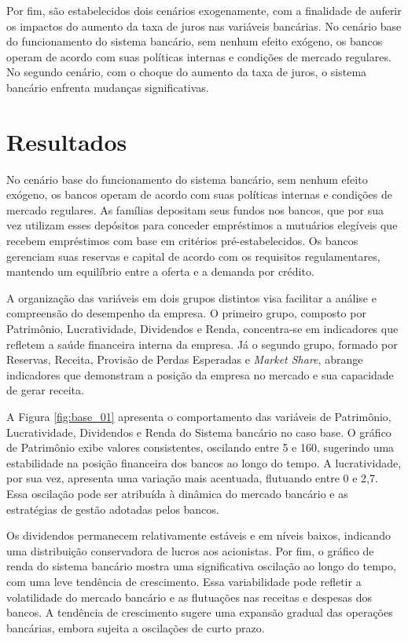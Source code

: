 \documentclass[hidelinks, article,12pt,oneside,a4paper,english,brazil,sumario=tradicional]{abntex2}
\begin{document}
Por fim, são estabelecidos dois cenários exogenamente, com a finalidade de auferir os impactos do aumento da taxa de juros nas variáveis bancárias. No cenário base do funcionamento do sistema bancário, sem nenhum efeito exógeno, os bancos operam de acordo com suas políticas internas e condições de mercado regulares. No segundo cenário, com o choque do aumento da taxa de juros, o sistema bancário enfrenta mudanças significativas. 



\section{Resultados}

No cenário base do funcionamento do sistema bancário, sem nenhum efeito exógeno, os bancos operam de acordo com suas políticas internas e condições de mercado regulares. As famílias depositam seus fundos nos bancos, que por sua vez utilizam esses depósitos para conceder empréstimos a mutuários elegíveis que recebem empréstimos com base em critérios pré-estabelecidos. Os bancos gerenciam suas reservas e capital de acordo com os requisitos regulamentares, mantendo um equilíbrio entre a oferta e a demanda por crédito.

A organização das variáveis em dois grupos distintos visa facilitar a análise e compreensão do desempenho da empresa. O primeiro grupo, composto por Patrimônio, Lucratividade, Dividendos e Renda, concentra-se em indicadores que refletem a saúde financeira interna da empresa. Já o segundo grupo, formado por Reservas, Receita, Provisão de Perdas Esperadas e \textit{Market Share}, abrange indicadores que demonstram a posição da empresa no mercado e sua capacidade de gerar receita.

A Figura \ref{fig:base_01} apresenta o comportamento das variáveis de Patrimônio, Lucratividade, Dividendos e Renda do Sistema bancário no caso base. O gráfico de Patrimônio exibe valores consistentes, oscilando entre 5 e 160, sugerindo uma estabilidade na posição financeira dos bancos ao longo do tempo. A lucratividade, por sua vez, apresenta uma variação mais acentuada, flutuando entre 0 e 2,7. Essa oscilação pode ser atribuída à dinâmica do mercado bancário e as estratégias de gestão adotadas pelos bancos. 

Os dividendos permanecem relativamente estáveis e em níveis baixos, indicando uma distribuição conservadora de lucros aos acionistas. Por fim, o gráfico de renda do sistema bancário mostra uma significativa oscilação ao longo do tempo, com uma leve tendência de crescimento. Essa variabilidade pode refletir a volatilidade do mercado bancário e as flutuações nas receitas e despesas dos bancos. A tendência de crescimento sugere uma expansão gradual das operações bancárias, embora sujeita a oscilações de curto prazo.
\end{document}
